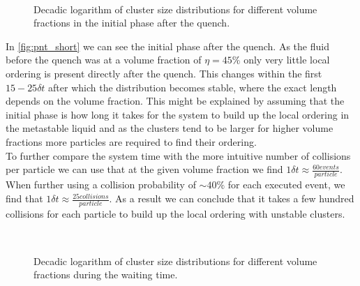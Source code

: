 \begin{figure}[h]
\begin{center}
 \hspace{0.0cm}
\\
 \hspace{0.0cm}
\caption[Cluster size distributions over time after quench]{Decadic logarithm of cluster size distributions for different volume fractions in the initial phase after the quench.}
\label{fig:pnt_short}
\end{center}
\end{figure}

In \autoref{fig:pnt_short} we can see the initial phase after the quench. As the fluid before the quench was at a volume fraction of $\eta=45\%$ only very little local ordering is present directly after the quench. This changes within the first $15 -25 \delta t$ after which the distribution becomes stable, where the exact length depends on the volume fraction. This might be explained by assuming that the initial phase is how long it takes for the system to build up the local ordering in the metastable liquid and as the clusters tend to be larger for higher volume fractions more particles are required to find their ordering.\\   
To further compare the system time with the more intuitive number of collisions per particle we can use that at the given volume fraction we find  $1\delta t \approx \frac{60 events}{particle}$. When further using a collision probability of $\sim 40 \%$ for each executed event, we find that $1\delta t \approx \frac{25 collisions}{particle}$. As a result we can conclude that it takes a few hundred collisions for each particle to build up the local ordering with unstable clusters.\\

\begin{figure}[h]
\begin{center}
 \hspace{0.0cm}
\\
 \hspace{0.0cm}
\caption[Cluster size distributions for long waiting times]{Decadic logarithm of cluster size distributions for different volume fractions during the waiting time.}
\label{fig:pnt_long}
\end{center}
\end{figure}

